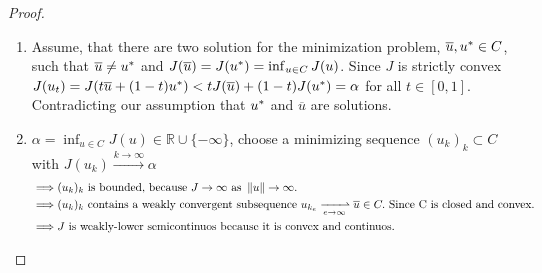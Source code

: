 \begin{theorem}
\begin{proof}
\begin{enumerate}
	\item Assume, that there are two solution for the minimization problem, $\overline{u}, {u}^{\ast} \in C$, such that $\overline{u}\neq {u}^{\ast}$ and $J(\overline{u})=J({u}^{\ast})=\inf_{u\in C} J(u)$. Since $J$ is strictly convex $J(u_t)=J(t\overline{u}+(1-t){u}^{\ast})<tJ(\overline{u})+(1-t)J({u}^{\ast}) = \alpha$ for all $t \in [0,1]$. Contradicting our assumption that ${u}^{\ast}$ and $\overline{u}$ are solutions.
	\item $\alpha = \inf_{u \in C} J(u) \in \mathbb{R}\cup\{-\infty\}$, choose a minimizing sequence $(u_k)_k\subset C$ with $J(u_k)\xrightarrow{k\rightarrow \infty} \alpha$
\begin{align*}
	\implies& (u_k)_k \mbox{ is bounded, because } J \rightarrow \infty \mbox{ as } \norm{u}\rightarrow \infty. \\
	\implies& (u_k)_k \mbox{ contains a weakly convergent subsequence } u_{k_e} \xrightharpoonup[e\rightarrow \infty]{}\overline{u}\in C. \mbox{ Since C is closed and convex.}\\
	\implies& J \mbox{ is weakly-lower semicontinuos because it is convex and continuos.}
\end{align*}

	\end{enumerate}
\end{proof}	

\end{theorem}